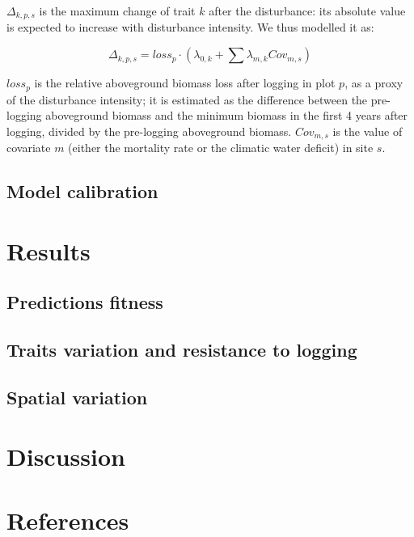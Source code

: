 \documentclass[]{elsarticle} %
\begin{document}
\(\Delta_{k,p,s}\) is the maximum change of trait \(k\) after the
disturbance: its absolute value is expected to increase with disturbance
intensity. We thus modelled it as:

\begin{equation} 
\Delta_{k,p,s} = loss_p \cdot (\lambda_{0,k} + \sum \lambda_{m,k} Cov_{m,s}) 
\end{equation}

\(loss_p\) is the relative aboveground biomass loss after logging in
plot \(p\), as a proxy of the disturbance intensity; it is estimated as
the difference between the pre-logging aboveground biomass and the
minimum biomass in the first 4 years after logging, divided by the
pre-logging aboveground biomass. \(Cov_{m,s}\) is the value of covariate
\(m\) (either the mortality rate or the climatic water deficit) in site
\(s\).

\subsection{Model calibration}\label{model-calibration}

\section{Results}\label{results}

\subsection{Predictions fitness}\label{predictions-fitness}

\subsection{Traits variation and resistance to
logging}\label{traits-variation-and-resistance-to-logging}

\subsection{Spatial variation}\label{spatial-variation}

\section{Discussion}\label{discussion}

\section*{References}\label{references}
\end{document}
